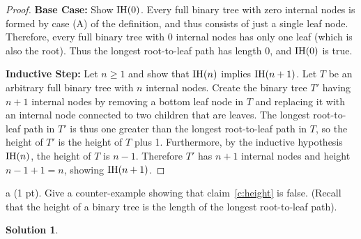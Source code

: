 \documentclass[11pt]{article}
\newtheorem*{solution}{Solution}
\begin{document}
\begin{enumerate}
\begin{proof}
{\bf Base Case:} Show $\P(0)$. 
Every  full binary tree with zero internal nodes is formed by
case (A) of the definition, and thus consists of 
just a single leaf node.  
Therefore, every full binary tree
with 0 internal nodes has only one leaf (which is also the root).
Thus the longest root-to-leaf path has length 0, and $\P(0)$ is true.

{\bf Inductive Step:} Let $n\geq 1$ and show that $\P(n)$ implies $\P(n+1)$.
Let $T$ be an arbitrary full binary tree with $n$ internal nodes.  
Create the binary tree $T'$ having $n+1$ internal nodes  
by removing a bottom leaf node in $T$ and replacing it with an internal node connected to
two children that are leaves.
The longest root-to-leaf path in $T'$ is thus one greater than the longest root-to-leaf path in $T$,
so the height of $T'$ is the height of $T$ plus 1.
Furthermore, by the inductive hypothesis $\P(n)$, the height of $T$ is $n-1$.
Therefore $T'$ has $n+1$ internal nodes and height $n-1+1=n$, showing $\P(n+1)$.
\end{proof}


a (1 pt). Give a counter-example showing that claim~\ref{c:height} is false.
(Recall that the height of a binary tree is the length of the longest root-to-leaf path).
\begin{solution}
\end{solution}
\newpage


\end{enumerate}
\end{document}
